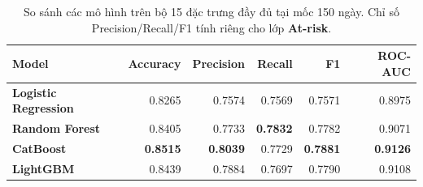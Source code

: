 \begin{table}[H]
  \centering
  \caption{So sánh các mô hình trên bộ 15 đặc trưng đầy đủ tại mốc 150 ngày. Chỉ số Precision/Recall/F1 tính riêng cho lớp \textbf{At-risk}.}
  \label{tab:compare_full}
  \small
  \setlength{\tabcolsep}{5pt}
  \begin{tabular}{lrrrrr}
    \toprule
    \textbf{Model} & \textbf{Accuracy} & \textbf{Precision} & \textbf{Recall} & \textbf{F1} & \textbf{ROC-AUC} \\
    \midrule
    \textbf{Logistic Regression} & 0.8265 & 0.7574 & 0.7569 & 0.7571 & 0.8975 \\
    \textbf{Random Forest} & 0.8405 & 0.7733 & \textbf{0.7832} & 0.7782 & 0.9071 \\
    \textbf{CatBoost} & \textbf{0.8515} & \textbf{0.8039} & 0.7729 & \textbf{0.7881} & \textbf{0.9126} \\
    \textbf{LightGBM} & 0.8439 & 0.7884 & 0.7697 & 0.7790 & 0.9108 \\
    \bottomrule
  \end{tabular}
\end{table}
